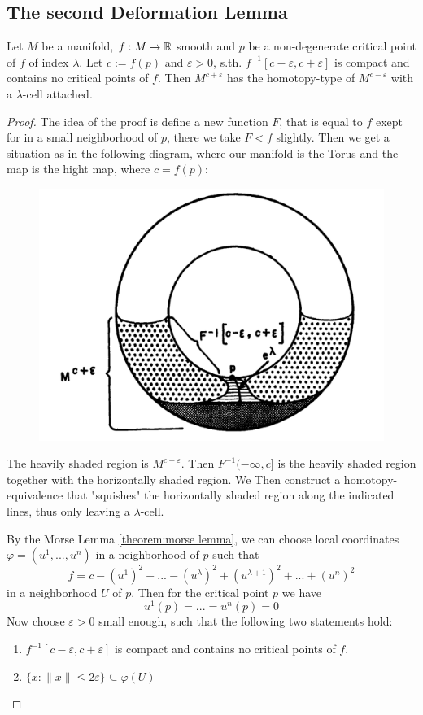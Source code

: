 \subsection{The second Deformation Lemma}

\begin{theorem}
   \label{theorem:2nd deformation lemma}
   Let $M$ be a manifold, $f: M \rightarrow {\mathbb R}$ smooth and $p$ be a 
   non-degenerate critical point of $f$ of index $\lambda$. Let $c := f(p)$ and 
   $\varepsilon > 0$, s.th. $f^{-1}[c-\varepsilon, c+\varepsilon]$ is compact 
   and contains no critical points of $f$. Then $M^{c+\varepsilon}$ has the
   homotopy-type of  $M^{c-\varepsilon}$ with a $\lambda$-cell attached.
\end{theorem}
 
\begin{proof}
   The idea of the proof is define a new function $F$, that is equal to $f$
   exept for in a small neighborhood of $p$, there we take $F < f$ slightly. 
   Then we get a situation as in the following diagram, where our manifold is
   the Torus and the map is the hight map, where $c = f(p)$:

   \begin{figure}[H]
      \centering
      \includegraphics[width=0.5\linewidth]{resources/Mil-Diagram4.png}
      \label{fig:mil-diagram4}
   \end{figure}

   The heavily shaded region is $M^{c-\varepsilon}$. Then $F^{-1}(-\infty, c]$ is
   the heavily shaded region together with the horizontally shaded region. We Then
   construct a homotopy-equivalence that "squishes" the horizontally shaded region
   along the indicated lines, thus only leaving a $\lambda$-cell.

   By the Morse Lemma \ref{theorem:morse lemma}, we can choose local coordinates
   $\varphi = (u^1, ..., u^n)$ in a neighborhood of $p$ such that 
   \[ f = c -  (u^1)^2 - ... - (u^{\lambda})^2 + (u^{\lambda + 1})^2 + ... + (u^n)^2 \]
   in a neighborhood $U$ of $p$. Then for the critical point $p$ we have
   \[ u^1(p) = ... = u^n(p) = 0 \]
   Now choose $\varepsilon > 0$ small enough, such that the following two 
   statements hold:
   \begin{enumerate}
      \item $f^{-1}[c - \varepsilon, c + \varepsilon]$ is compact and contains
         no critical points of $f$.
      \item $\{ x: \lVert x \rVert \leq 2\varepsilon \} \subseteq \varphi(U)$
   \end{enumerate}


\end{proof}
